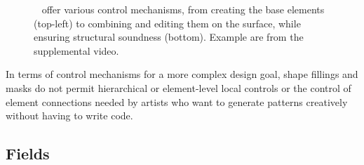 \begin{figure}[t]
    \centering
    \caption{\label{fig:zehnder_2016_dso}\citeauthor*{zehnder_2016_dso}~\cite{zehnder_2016_dso} offer various control mechanisms, from creating the base elements (top-left) to combining and editing them on the surface, while ensuring structural soundness (bottom). Example are from the supplemental video. }
\end{figure}

In terms of control mechanisms for a more complex design goal, shape fillings and masks do not permit hierarchical or element-level local controls or the control of element connections needed by artists who want to generate patterns creatively without having to write code.


\subsection{Fields}
\label{subsubsec:analysis_creative_means_fields}

